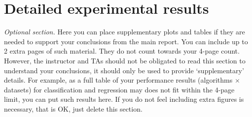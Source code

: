\section{Detailed experimental results}

{\em Optional section.} Here you can place supplementary plots and tables if they are needed to
support your conclusions from the main report.
You can include up to 2 extra pages of such material.
They do not count towards your 4-page count.
However, the instructor and TAs should not be obligated to read this
section to understand your conclusions, it should only be used to provide `supplementary' details.
For example, as a full table of your performance results (algorithms $\times$ datasets)
for classification and regression may does not fit within the 4-page limit,
you can put such results here.
If you do not feel including extra figures is necessary, that is OK, just delete this section.
